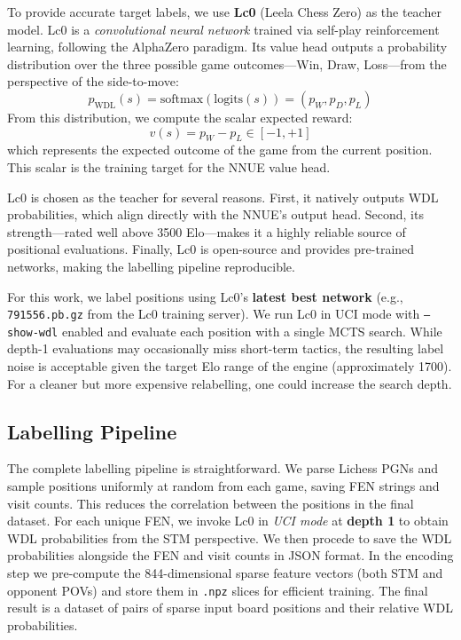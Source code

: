 To provide accurate target labels, we use \textbf{Lc0} (Leela Chess Zero) as the teacher model. Lc0 is a \emph{convolutional neural network} trained via self-play reinforcement learning, following the AlphaZero paradigm. Its value head outputs a probability distribution over the three possible game outcomes---Win, Draw, Loss---from the perspective of the side-to-move:
\[
p_{\mathrm{WDL}}(s) = \mathrm{softmax}(\mathrm{logits}(s)) = (p_W, p_D, p_L)
\]
From this distribution, we compute the scalar expected reward:
\[
v(s) = p_W - p_L \in [-1, +1]
\]
which represents the expected outcome of the game from the current position. This scalar is the training target for the NNUE value head.

Lc0 is chosen as the teacher for several reasons. First, it natively outputs WDL probabilities, which align directly with the NNUE's output head. Second, its strength---rated well above 3500 Elo---makes it a highly reliable source of positional evaluations. Finally, Lc0 is open-source and provides pre-trained networks, making the labelling pipeline reproducible.

For this work, we label positions using Lc0's \textbf{latest best network} (e.g., \texttt{791556.pb.gz} from the Lc0 training server). We run Lc0 in UCI mode with \texttt{--show-wdl} enabled and evaluate each position with a single MCTS search. While depth-1 evaluations may occasionally miss short-term tactics, the resulting label noise is acceptable given the target Elo range of the engine (approximately 1700). For a cleaner but more expensive relabelling, one could increase the search depth.

\subsection{Labelling Pipeline}\label{sec:labelling-pipeline}

The complete labelling pipeline is straightforward. We parse Lichess PGNs and sample positions uniformly at random from each game, saving FEN strings and visit counts. This reduces the correlation between the positions in the final dataset. For each unique FEN, we invoke Lc0 in \emph{UCI mode} at \textbf{depth 1} to obtain WDL probabilities from the STM perspective. We then procede to save the WDL probabilities alongside the FEN and visit counts in JSON format. In the encoding step we pre-compute the 844-dimensional sparse feature vectors (both STM and opponent POVs) and store them in \texttt{.npz} slices for efficient training. The final result is a dataset of pairs of sparse input board positions and their relative WDL probabilities.

